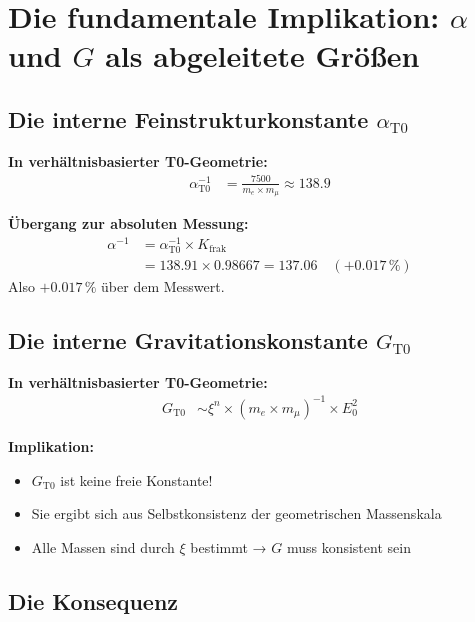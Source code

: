 	\section{Die fundamentale Implikation: $\alpha$ und $G$ als abgeleitete Größen}
	
	\subsection{Die interne Feinstrukturkonstante $\alpha_{\text{T0}}$}
	
	\textbf{In verhältnisbasierter T0-Geometrie:}
	\begin{align*}
		\alpha_{\text{T0}}^{-1} &= \frac{7500}{m_e \times m_μ} \approx 138.9
	\end{align*}
	
	\textbf{Übergang zur absoluten Messung:}
	\begin{align*}
		\alpha^{-1} &= \alpha_{\text{T0}}^{-1} \times K_{\text{frak}} \\
		&= 138.91 \times 0.98667 = 137.06 \quad (+0.017\,\%)
	\end{align*}
	Also $+0.017\,\%$ über dem Messwert.
	
	\subsection{Die interne Gravitationskonstante $G_{\text{T0}}$}
	
	\textbf{In verhältnisbasierter T0-Geometrie:}
	\begin{align*}
		G_{\text{T0}} &\sim \xi^n \times (m_e \times m_μ)^{-1} \times E_0^2
	\end{align*}
	
	\textbf{Implikation:}
	\begin{itemize}
		\item $G_{\text{T0}}$ ist keine freie Konstante!
		\item Sie ergibt sich aus Selbstkonsistenz der geometrischen Massenskala
		\item Alle Massen sind durch $\xi$ bestimmt → $G$ muss konsistent sein
	\end{itemize}
	
	\subsection{Die Konsequenz}
	
	\begin{center}
	\end{center}
	
